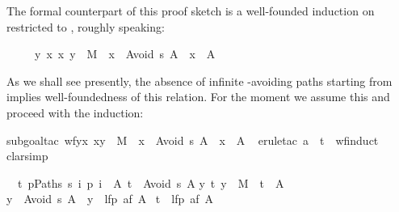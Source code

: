 \begin{isabellebody}
\begin{isamarkuptxt}
The formal counterpart of this proof sketch is a well-founded induction
on~ restricted to , roughly speaking:
\begin{isabelle}%
\ \ \ \ \ {\isacharbraceleft}{\isacharparenleft}y{\isacharcomma}\ x{\isacharparenright}{\isachardot}\ {\isacharparenleft}x{\isacharcomma}\ y{\isacharparenright}\ {\isasymin}\ M\ {\isasymand}\ x\ {\isasymin}\ Avoid\ s\ A\ {\isasymand}\ x\ {\isasymnotin}\ A{\isacharbraceright}%
\end{isabelle}
As we shall see presently, the absence of infinite -avoiding paths
starting from  implies well-foundedness of this relation. For the
moment we assume this and proceed with the induction:%
\end{isamarkuptxt}%
\isamarkuptrue%
subgoal{\isacharunderscore}tac\ {\isachardoublequote}wf{\isacharbraceleft}{\isacharparenleft}y{\isacharcomma}x{\isacharparenright}{\isachardot}\ {\isacharparenleft}x{\isacharcomma}y{\isacharparenright}\ {\isasymin}\ M\ {\isasymand}\ x\ {\isasymin}\ Avoid\ s\ A\ {\isasymand}\ x\ {\isasymnotin}\ A{\isacharbraceright}{\isachardoublequote}{\isacharparenright}\isanewline
\ \isamarkupfalse%
erule{\isacharunderscore}tac\ a\ {\isacharequal}\ t\ \ wf{\isacharunderscore}induct{\isacharparenright}\isanewline
\ \isamarkupfalse%
clarsimp{\isacharparenright}\isamarkupfalse%
\isamarkupfalse%
%
\begin{isamarkuptxt}%
\noindent
\begin{isabelle}%
\ {}{\isachardot}\ {\isasymAnd}t{\isachardot}\ {\isasymlbrakk}{\isasymforall}p{\isasymin}Paths\ s{\isachardot}\ {\isasymexists}i{\isachardot}\ p\ i\ {\isasymin}\ A{\isacharsemicolon}\ t\ {\isasymin}\ Avoid\ s\ A{\isacharsemicolon}\isanewline
{}y{\isachardot}\ {\isacharparenleft}t{\isacharcomma}\ y{\isacharparenright}\ {\isasymin}\ M\ {\isasymand}\ t\ {\isasymnotin}\ A\ {\isasymlongrightarrow}\isanewline
{}y\ {\isasymin}\ Avoid\ s\ A\ {\isasymlongrightarrow}\ y\ {\isasymin}\ lfp\ {\isacharparenleft}af\ A{\isacharparenright}{\isasymrbrakk}\isanewline
{}\ t\ {\isasymin}\ lfp\ {\isacharparenleft}af\ A{\isacharparenright}\isanewline

\end{isabelle}
\end{isamarkuptxt}
\end{isabellebody}
